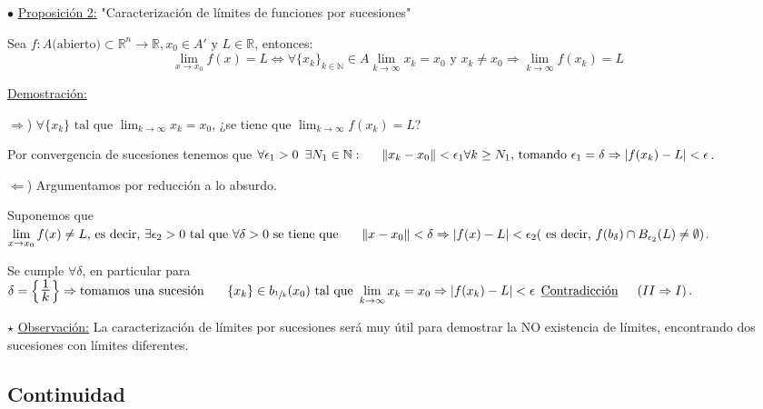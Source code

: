 \documentclass[12pt, titlepage]{article}
\newcommand{\R}{\mathbb{R}}
\newcommand{\N}{\mathbb{N}}
\newcommand{\bfrac}[2]{\scalebox{1.4}{$\frac{#1}{#2}$}}
\newcommand{\spac}{\, \, \,}
\newcommand{\proposicion}[1][\!\!]{\noindent$\bullet$ \underline{Proposición #1:} }
\newcommand{\observacion}{\noindent$\star$ \underline{Observación:} }
\begin{document}

{\color{red}\proposicion[2] "Caracterización de límites de funciones por  sucesiones"}
\vspace{2mm}

Sea $f : A \text{(abierto)} \subset \R^n \to \R, x_0 \in A' \text{ y } L \in \R$, entonces:
\[
\boxed{
\displaystyle \lim_{x \to x_0}^{} f (x) = L \iff \forall \{x_k\}_{k \in \N} \in A \lim_{k \to \infty} x_k = x_0 \text{ y } x_k \neq x_0 \Rightarrow \lim_{k \to \infty} f (x_k) = L
}
\]
\vspace{3mm}

\underline{Demostración:}

$\Rightarrow$) $\forall \{x_k\} \text{ tal que } \displaystyle \lim_{k \to \infty} x_k = x_0$, ¿se tiene que 
$\displaystyle \lim_{k \to \infty} f (x_k) = L$?

Por convergencia de sucesiones tenemos 	que $\forall{\epsilon_1 > 0} \spac \exists{N_1 \in \N} : \\ \indent
\|x_k - x_0\| < \epsilon_1 \forall{k \geq N_1} \text{, tomando } \epsilon_1 = \delta \Rightarrow |f (x_k) - 
L| < \epsilon$.

$\Leftarrow$) Argumentamos por reducción a lo absurdo. 

Suponemos que $\displaystyle \lim_{x \to x_0} 
f (x) \neq L \text{, es decir, } \exists{\epsilon_2 > 0} \text{ tal que } \forall{\delta > 0} \text{  se tiene que } 
\\ \indent \|x - x_0\| < \delta \Rightarrow |f (x) - L| < \epsilon_2 \text{( es decir, } f (b_\delta) \cap 
 B_{\epsilon_2} (L) \neq \emptyset)$.

Se cumple $\forall \delta$, en particular para $\delta = \left \{ \bfrac{1}{k} \right \} \Rightarrow 
\text{tomamos una sucesión } \\ \indent \{x_k\} \in b_{\sfrac{1}{k}} (x_0) \text{ tal que } \displaystyle 
 \lim_{k \to \infty} x_k = x_0 \Rightarrow |f (x_k) - L| < \epsilon \spac \text{\underline{Contradicción}} \\
\indent (II \Rightarrow I)$.
\vspace{3mm}

\observacion La caracterización de límites por sucesiones será muy útil para demostrar la NO existencia de 
límites, encontrando dos sucesiones con límites diferentes.
\vspace{3mm}


\subsection{Continuidad}
\vspace{5mm}
\end{document}
